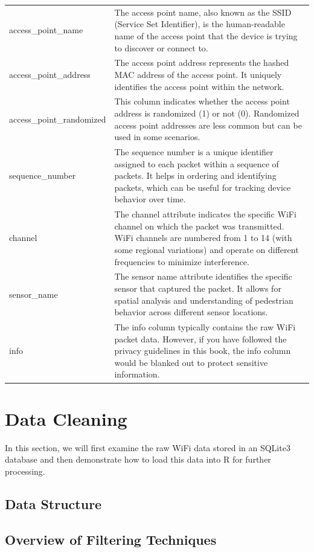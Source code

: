\documentclass[
  letterpaper,
]{scrbook}
\begin{document}
\begin{longtable}[]{@{}
  >{\raggedright\arraybackslash}p{}
  >{\raggedright\arraybackslash}p{}@{}}
access\_point\_name & The access point name, also known as the SSID
(Service Set Identifier), is the human-readable name of the access point
that the device is trying to discover or connect to. \\
access\_point\_address & The access point address represents the hashed
MAC address of the access point. It uniquely identifies the access point
within the network. \\
access\_point\_randomized & This column indicates whether the access
point address is randomized (1) or not (0). Randomized access point
addresses are less common but can be used in some scenarios. \\
sequence\_number & The sequence number is a unique identifier assigned
to each packet within a sequence of packets. It helps in ordering and
identifying packets, which can be useful for tracking device behavior
over time. \\
channel & The channel attribute indicates the specific WiFi channel on
which the packet was transmitted. WiFi channels are numbered from 1 to
14 (with some regional variations) and operate on different frequencies
to minimize interference. \\
sensor\_name & The sensor name attribute identifies the specific sensor
that captured the packet. It allows for spatial analysis and
understanding of pedestrian behavior across different sensor
locations. \\
info & The info column typically contains the raw WiFi packet data.
However, if you have followed the privacy guidelines in this book, the
info column would be blanked out to protect sensitive information. \\
\end{longtable}

\chapter{Data Cleaning}\label{data-cleaning}

In this section, we will first examine the raw WiFi data stored in an
SQLite3 database and then demonstrate how to load this data into R for
further processing.

\section{Data Structure}\label{data-structure}

\section{Overview of Filtering
Techniques}\label{overview-of-filtering-techniques}
\end{document}
